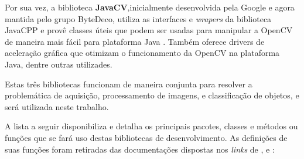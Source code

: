 Por sua vez, a biblioteca \textbf{JavaCV},inicialmente desenvolvida pela Google e agora mantida pelo grupo ByteDeco, utiliza as interfaces e \textit{wrapers} da biblioteca JavaCPP e provê classes úteis que podem ser usadas para manipular a  OpenCV de maneira mais fácil para plataforma Java \cite{javacv}. Também oferece drivers de aceleração gráfica que otimizam o funcionamento da OpenCV na plataforma Java, dentre outras utilizades.

Estas três bibliotecas funcionam de maneira conjunta para resolver a problemática de aquisição, processamento de imagens, e classificação de objetos, e será utilizada neste trabalho.

A lista a seguir disponibiliza e detalha os principais pacotes, classes e métodos ou funções que se fará uso destas bibliotecas de desenvolvimento. As definições de suas funções foram retiradas das documentações dispostas nos \textit{links} de \cite{opencv}, \cite{javacv} e \cite{javacpp}: 

